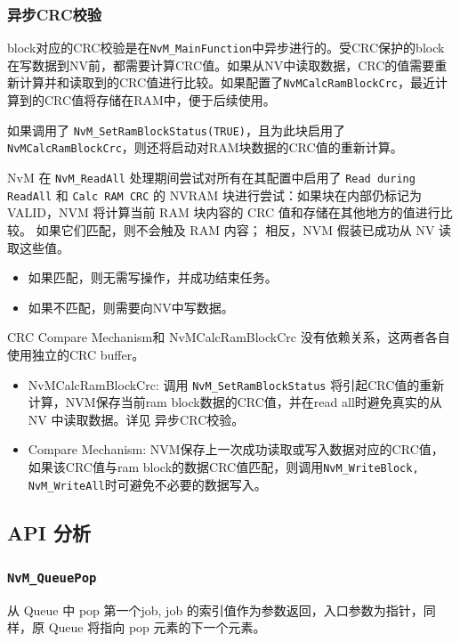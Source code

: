 \subsubsection{异步CRC校验}

block对应的CRC校验是在\lstinline{NvM_MainFunction}中异步进行的。受CRC保护的block在写数据到NV前，都需要计算CRC值。如果从NV中读取数据，CRC的值需要重新计算并和读取到的CRC值进行比较。如果配置了\lstinline{NvMCalcRamBlockCrc}，最近计算到的CRC值将存储在RAM中，便于后续使用。

如果调用了
\lstinline{NvM_SetRamBlockStatus(TRUE)}，且为此块启用了\lstinline{NvMCalcRamBlockCrc}，则还将启动对RAM块数据的CRC值的重新计算。

NvM 在 \lstinline{NvM_ReadAll} 处理期间尝试对所有在其配置中启用了 \lstinline{Read during ReadAll} 和 \lstinline{Calc RAM CRC} 的
NVRAM 块进行尝试：如果块在内部仍标记为 VALID，NVM 将计算当前 RAM
块内容的 CRC 值和存储在其他地方的值进行比较。 如果它们匹配，则不会触及
RAM 内容； 相反，NVM 假装已成功从 NV 读取这些值。

\begin{itemize}
\item
  如果匹配，则无需写操作，并成功结束任务。
\item
  如果不匹配，则需要向NV中写数据。
\end{itemize}

CRC Compare Mechanism和 NvMCalcRamBlockCrc
没有依赖关系，这两者各自使用独立的CRC buffer。

\begin{itemize}
\item
  NvMCalcRamBlockCrc:
  调用 \lstinline{NvM_SetRamBlockStatus} 将引起CRC值的重新计算，NVM保存当前ram
  block数据的CRC值，并在read all时避免真实的从NV
  中读取数据。详见 异步CRC校验。
\item
  Compare Mechanism:
  NVM保存上一次成功读取或写入数据对应的CRC值，如果该CRC值与ram
  block的数据CRC值匹配，则调用\lstinline{NvM_WriteBlock, NvM_WriteAll}时可避免不必要的数据写入。
\end{itemize}

\subsection{API 分析}
\subsubsection{\lstinline{NvM_QueuePop}}

从 Queue 中 pop 第一个job, job 的索引值作为参数返回，入口参数为指针，同样，原 Queue 将指向 pop 元素的下一个元素。

